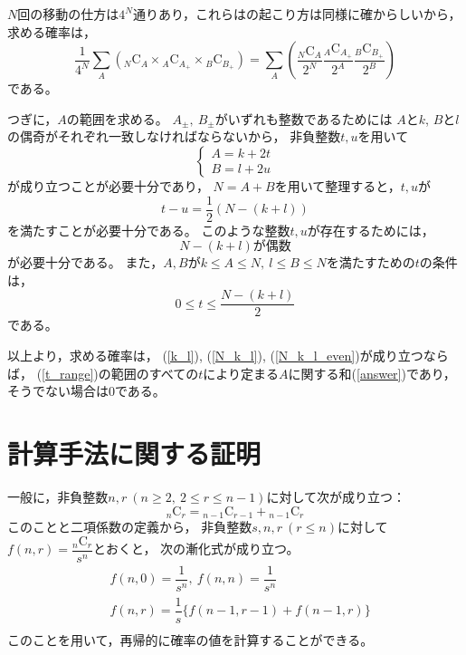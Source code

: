 \documentclass{article}
\begin{document}
$N$回の移動の仕方は$4^N$通りあり，これらはの起こり方は同様に確からしいから，求める確率は，
\begin{equation}
    \label{answer}
    \dfrac{1}{4^N}
    \sum_{A}
    \left(
    {}_N \mathrm{C}_{A}
    \times
    {}_A \mathrm{C}_{A_+}
    \times
    {}_B \mathrm{C}_{B_+}
    \right)
    =
    \sum_{A}
    \left(
    \dfrac{{}_N \mathrm{C}_{A}}{2^N}
    \dfrac{{}_A \mathrm{C}_{A_+}}{2^A}
    \dfrac{{}_B \mathrm{C}_{B_+}}{2^B}
    \right)
\end{equation}
である。

つぎに，$A$の範囲を求める。
$A_\pm,\ B_\pm$がいずれも整数であるためには
$A$と$k$, $B$と$l$の偶奇がそれぞれ一致しなければならないから，
非負整数$t, u$を用いて
\begin{equation*}
    \begin{cases}
        A = k + 2t \\
        B = l + 2u
    \end{cases}
\end{equation*}
が成り立つことが必要十分であり，
$N = A + B$を用いて整理すると，$t, u$が
\begin{equation*}
    t - u = \dfrac{1}{2} (N - (k + l))
\end{equation*}
を満たすことが必要十分である。
このような整数$t, u$が存在するためには，
\begin{equation}
    \label{N_k_l_even}
    N - (k + l) \mbox{が偶数}
\end{equation}
が必要十分である。
また，$A, B$が$k \leq A \leq N,\ l \leq B \leq N$を満たすための$t$の条件は，
\begin{equation}
    \label{t_range}
    0 \leq t \leq \dfrac{N - (k + l)}{2}
\end{equation}
である。

以上より，求める確率は，
(\ref{k_l}), (\ref{N_k_l}), (\ref{N_k_l_even})が成り立つならば，
(\ref{t_range})の範囲のすべての$t$により定まる$A$に関する和(\ref{answer})であり，
そうでない場合は0である。



\section{計算手法に関する証明}

一般に，非負整数$n, r\ (n \geq 2,\ 2 \leq r \leq n - 1)$に対して次が成り立つ：
\begin{equation*}
    {}_n \mathrm{C}_r = {}_{n-1} \mathrm{C}_{r-1} + {}_{n-1} \mathrm{C}_{r}
\end{equation*}
このことと二項係数の定義から，
非負整数$s, n, r\ (r \leq n)$に対して$f(n, r) = \dfrac{{}_n \mathrm{C}_r}{s^n}$とおくと，
次の漸化式が成り立つ。
\begin{eqnarray*}
    &f(n, 0) = \dfrac{1}{s^n},\ f(n, n) = \dfrac{1}{s^n} \\
    &f(n, r) = \dfrac{1}{s} \{f(n-1, r-1) + f(n-1, r)\} \\
\end{eqnarray*}
このことを用いて，再帰的に確率の値を計算することができる。
\end{document}
